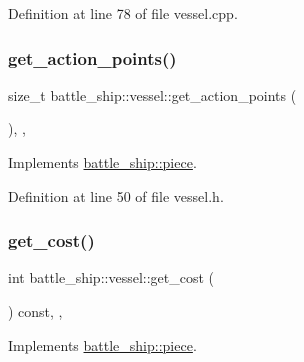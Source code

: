Definition at line 78 of file vessel.\+cpp.

\mbox{\label{classbattle__ship_1_1vessel_a398b4134137d9e11c13e6aee548e1802}} 
\subsubsection{\texorpdfstring{get\+\_\+action\+\_\+points()}{get\_action\_points()}}
{\footnotesize\ttfamily size\+\_\+t battle\+\_\+ship\+::vessel\+::get\+\_\+action\+\_\+points (\begin{DoxyParamCaption}{ }\end{DoxyParamCaption})\hspace{0.3cm}{\ttfamily [inline]}, {\ttfamily [override]}, {\ttfamily [virtual]}}



Implements \hyperlink{classbattle__ship_1_1piece_a63f00d666a65cd41a11b592d55411b7f}{battle\+\_\+ship\+::piece}.



Definition at line 50 of file vessel.\+h.

\mbox{\label{classbattle__ship_1_1vessel_aadca1fe2ac265ed9f22e68490b6b22eb}} 
\subsubsection{\texorpdfstring{get\+\_\+cost()}{get\_cost()}}
{\footnotesize\ttfamily int battle\+\_\+ship\+::vessel\+::get\+\_\+cost (\begin{DoxyParamCaption}{ }\end{DoxyParamCaption}) const\hspace{0.3cm}{\ttfamily [inline]}, {\ttfamily [override]}, {\ttfamily [virtual]}}



Implements \hyperlink{classbattle__ship_1_1piece_a9193782bce8a697bd5d3cb391d5f1623}{battle\+\_\+ship\+::piece}.



